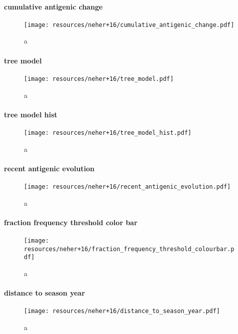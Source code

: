 \documentclass{beamer}
\begin{document}
\begin{darkframes}
    \begin{frame}{\subsecname}
      \framesubtitle{cumulative antigenic change}
      \begin{figure}
        \texttt{[image: resources/neher+16/cumulative\_antigenic\_change.pdf]}
        \caption{\footnotesize a}
      \end{figure}
    \end{frame}

    \begin{frame}{\subsecname}
      \framesubtitle{tree model}
      \begin{figure}
        \texttt{[image: resources/neher+16/tree\_model.pdf]}
        \caption{\footnotesize a}
      \end{figure}
    \end{frame}

    \begin{frame}{\subsecname}
      \framesubtitle{tree model hist}
      \begin{figure}
        \texttt{[image: resources/neher+16/tree\_model\_hist.pdf]}
        \caption{\footnotesize a}
      \end{figure}
    \end{frame}

    \begin{frame}{\subsecname}
      \framesubtitle{recent antigenic evolution}
      \begin{figure}
        \texttt{[image: resources/neher+16/recent\_antigenic\_evolution.pdf]}
        \caption{\footnotesize a}
      \end{figure}
    \end{frame}

    \begin{frame}{\subsecname}
      \framesubtitle{fraction frequency threshold color bar}
      \begin{figure}
        \texttt{[image: resources/neher+16/fraction\_frequency\_threshold\_colourbar.pdf]}
        \caption{\footnotesize a}
      \end{figure}
    \end{frame}

    \begin{frame}{\subsecname}
      \framesubtitle{distance to season year}
      \begin{figure}
        \texttt{[image: resources/neher+16/distance\_to\_season\_year.pdf]}
        \caption{\footnotesize a}
      \end{figure}
    \end{frame}



\end{darkframes}
\end{document}
